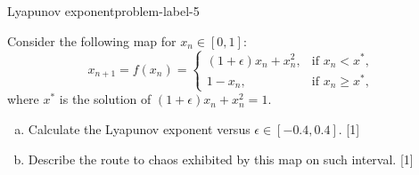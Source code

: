\begin{problem}{Lyapunov exponent}{problem-label-5}

Consider the following map for $x_n \in [0,1]$:
\[
    x_{n+1} = f(x_n) = \begin{cases}
        (1+\epsilon)x_n + x_n^2, & \text{if } x_n < x^*, \\
        1-x_n, & \text{if } x_n \geq x^*,
    \end{cases}
\]
where $x^*$ is the solution of $(1+\epsilon)x_n + x_n^2 = 1$.

\begin{enumerate}[(a)]
    \item Calculate the Lyapunov exponent versus $\epsilon \in [-0.4, 0.4]$. [1]
    \item Describe the route to chaos exhibited by this map on such interval. [1]

\end{enumerate}
\end{problem}

